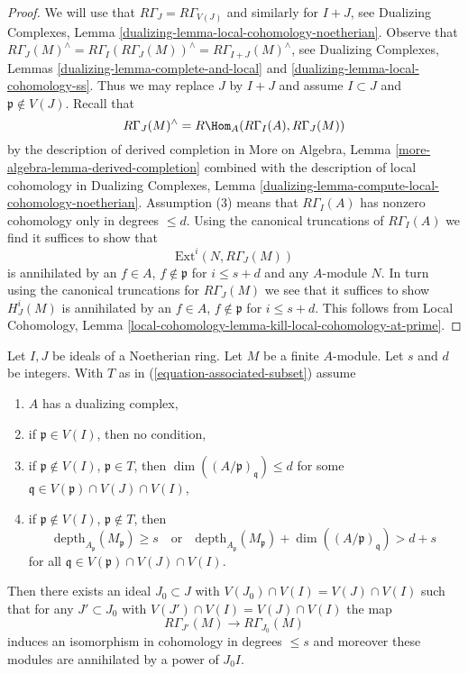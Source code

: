 \begin{proof}
We will use that $R\Gamma_J = R\Gamma_{V(J)}$ and similarly for
$I + J$, see
Dualizing Complexes, Lemma \ref{dualizing-lemma-local-cohomology-noetherian}.
Observe that
$R\Gamma_J(M)^\wedge = R\Gamma_I(R\Gamma_J(M))^\wedge =
R\Gamma_{I + J}(M)^\wedge$, see
Dualizing Complexes, Lemmas
\ref{dualizing-lemma-complete-and-local} and
\ref{dualizing-lemma-local-cohomology-ss}.
Thus we may replace $J$ by $I + J$ and assume $I \subset J$
and $\mathfrak p \not \in V(J)$.
Recall that
$$
R\Gamma_J(M)^\wedge = R\Hom_A(R\Gamma_I(A), R\Gamma_J(M))
$$
by the description of derived completion in
More on Algebra, Lemma \ref{more-algebra-lemma-derived-completion}
combined with the description of local cohomology in
Dualizing Complexes, Lemma
\ref{dualizing-lemma-compute-local-cohomology-noetherian}.
Assumption (3) means that $R\Gamma_I(A)$ has nonzero cohomology
only in degrees $\leq d$. Using the canonical truncations of
$R\Gamma_I(A)$ we find it suffices to show that
$$
\text{Ext}^i(N, R\Gamma_J(M))
$$
is annihilated by an $f \in A$, $f \not \in \mathfrak p$ for
$i \leq s + d$ and any $A$-module $N$.
In turn using the canonical truncations for $R\Gamma_J(M)$
we see that it suffices to show
$H^i_J(M)$ is annihilated by an $f \in A$, $f \not \in \mathfrak p$
for $i \leq s + d$.
This follows from Local Cohomology, Lemma
\ref{local-cohomology-lemma-kill-local-cohomology-at-prime}.
\end{proof}

\begin{lemma}
\label{lemma-kill-colimit-weak-general}
Let $I, J$ be ideals of a Noetherian ring. Let $M$ be a finite $A$-module.
Let $s$ and $d$ be integers. With $T$ as in
(\ref{equation-associated-subset}) assume
\begin{enumerate}
\item $A$ has a dualizing complex,
\item if $\mathfrak p \in V(I)$, then no condition,
\item if $\mathfrak p \not \in V(I)$, $\mathfrak p \in T$, then
$\dim((A/\mathfrak p)_\mathfrak q) \leq d$ for some
$\mathfrak q \in V(\mathfrak p) \cap V(J) \cap V(I)$,
\item if $\mathfrak p \not \in V(I)$, $\mathfrak p \not \in T$, then
$$
\text{depth}_{A_\mathfrak p}(M_\mathfrak p) \geq s
\quad\text{or}\quad
\text{depth}_{A_\mathfrak p}(M_\mathfrak p) +
\dim((A/\mathfrak p)_\mathfrak q) > d + s
$$
for all $\mathfrak q \in V(\mathfrak p) \cap V(J) \cap V(I)$.
\end{enumerate}
Then there exists an ideal $J_0 \subset J$ with
$V(J_0) \cap V(I) = V(J) \cap V(I)$ such that for any $J' \subset J_0$ with
$V(J') \cap V(I) = V(J) \cap V(I)$ the map
$$
R\Gamma_{J'}(M) \longrightarrow R\Gamma_{J_0}(M)
$$
induces an isomorphism in cohomology in degrees $\leq s$
and moreover these modules are annihilated by a power of $J_0I$.
\end{lemma}


